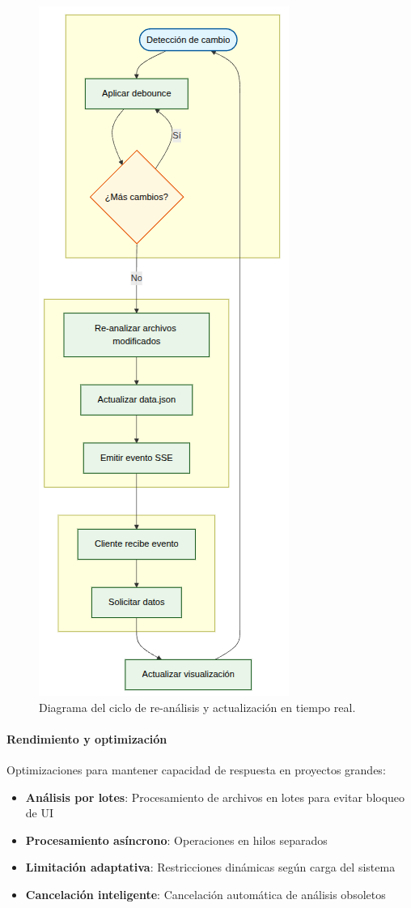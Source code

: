 \documentclass[a4paper, 12pt]{book}
\begin{document}
\begin{figure}[H]
\centering
\includegraphics[width=0.45\linewidth]{img/ciclo-reanalisis-tiempo-real.png}
\caption{Diagrama del ciclo de re-análisis y actualización en tiempo real.}
\label{fig:reanalisis-ciclo}
\end{figure}

\paragraph{Rendimiento y optimización}
Optimizaciones para mantener capacidad de respuesta en proyectos grandes:

\begin{itemize}
  \item \textbf{Análisis por lotes}: Procesamiento de archivos en lotes para evitar bloqueo de UI
  \item \textbf{Procesamiento asíncrono}: Operaciones en hilos separados
  \item \textbf{Limitación adaptativa}: Restricciones dinámicas según carga del sistema
  \item \textbf{Cancelación inteligente}: Cancelación automática de análisis obsoletos
\end{itemize}
\end{document}
